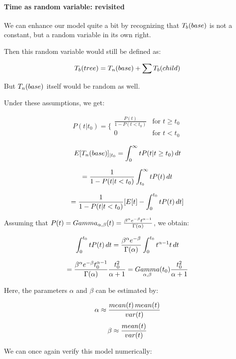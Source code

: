 \paragraph{Time as random variable: revisited}

We can enhance our model quite a bit by recognizing that $T_b(\mathop{base})$ is not a constant, but a random variable in its own right. 

Then this random variable would still be defined as: 

$$ T_b(\mathop{tree}) = T_n(\mathop{base}) + \sum T_b(\mathop{child}) $$

But $T_n(\mathop{base})$ itself would be random as well. 

Under these assumptions, we get: 

$$ P(t | t_0) = \{ \begin{array}{lr}
        \frac{P(t)}{1 - P(t<t_0)}       & \text{for } t \geq t_0 \\
        0                               & \text{for }  t < t_0
        \end{array}  $$

$$ E[T_n(\mathop{base})]_{|t_0} = \int_0^\infty t P(t|t\geq t_0) \mathop{dt} $$

$$ = \frac{1}{1 - P(t|t<t_0)} \int_{t_0}^\infty t P(t) \mathop{dt} $$

$$ = \frac{1}{1 - P(t|t<t_0)} [ E[t] - \int_0^{t_0} t P(t) \mathop{dt} ] $$

Assuming that $P(t) = \mathop{Gamma}_{\alpha,\beta}(t) = \frac{\beta^\alpha e^{-\beta} t^{\alpha-1} }{\Gamma(\alpha) } $, we obtain: 

$$ \int_0^{t_0} t P(t) \mathop{dt} = \frac{\beta^\alpha e^{-\beta} }{\Gamma(\alpha) } \int_0^{t_0} t^{\alpha - 1} t \mathop{dt} $$

$$ =  \frac{\beta^\alpha e^{-\beta} t_0^{\alpha-1} }{\Gamma(\alpha) }  \frac{t_0^2}{\alpha + 1} = \mathop{Gamma}_{\alpha, \beta}(t_0) \frac{t_0^2}{\alpha + 1} $$


Here, the parameters $\alpha$ and $\beta$ can be estimated by: 

$$ \alpha \approx \frac{\mathop{mean}(t) \mathop{mean}(t)}{\mathop{var}(t)} $$
$$ \beta \approx \frac{\mathop{mean}(t)}{\mathop{var}(t)} $$


We can once again verify this model numerically: 

